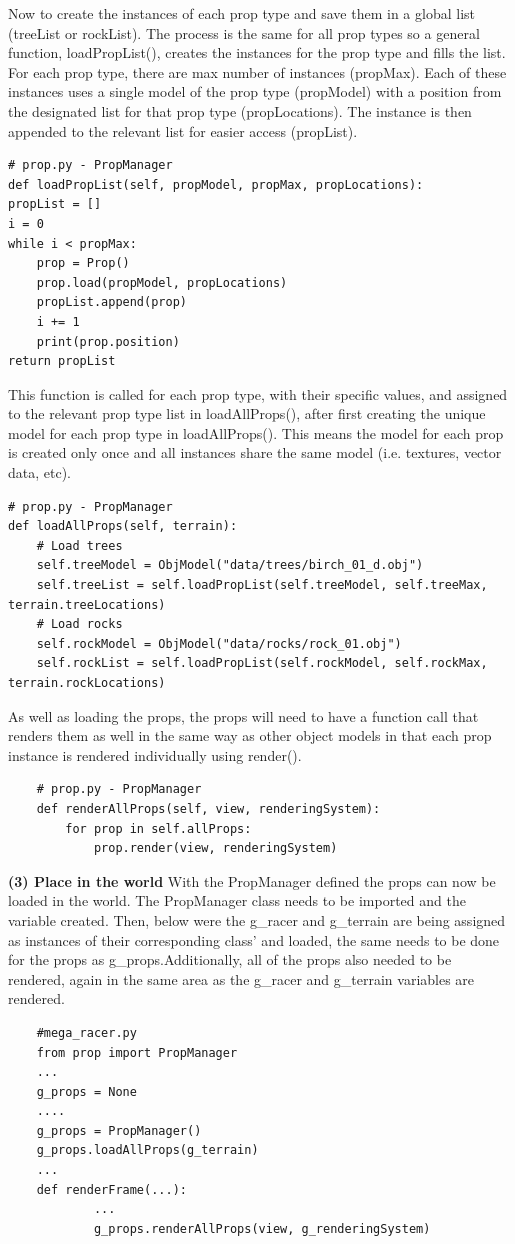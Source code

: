 \documentclass[a4 paper, 12pt]{article}
\begin{document}
Now to create the instances of each prop type and save them in a global list (treeList or rockList). The process is the same for all prop types so a general function, loadPropList(), creates the instances for the prop type and fills the list. For each prop type, there are max number of instances (propMax). Each of these instances uses a single model of the prop type (propModel) with a position from the designated list for that prop type (propLocations). The instance is then appended to the relevant list for easier access (propList). 
    \begin{lstlisting}
# prop.py - PropManager
def loadPropList(self, propModel, propMax, propLocations):
propList = []
i = 0
while i < propMax:
    prop = Prop()
    prop.load(propModel, propLocations)
    propList.append(prop)            
    i += 1
    print(prop.position)
return propList
    \end{lstlisting} 

This function is called for each prop type, with their specific values, and assigned to the relevant prop type list in loadAllProps(), after first creating the unique model for each prop type in loadAllProps(). This means the model for each prop is created only once and all instances share the same model (i.e. textures, vector data, etc). 
    \begin{lstlisting}
# prop.py - PropManager 
def loadAllProps(self, terrain): 
    # Load trees
    self.treeModel = ObjModel("data/trees/birch_01_d.obj")
    self.treeList = self.loadPropList(self.treeModel, self.treeMax, terrain.treeLocations)
    # Load rocks
    self.rockModel = ObjModel("data/rocks/rock_01.obj")
    self.rockList = self.loadPropList(self.rockModel, self.rockMax, terrain.rockLocations)
    \end{lstlisting}

As well as loading the props, the props will need to have a function call that renders them as well in the same way as other object models in that each prop instance is rendered individually using render().
\begin{lstlisting}
    # prop.py - PropManager 
    def renderAllProps(self, view, renderingSystem):
        for prop in self.allProps:
            prop.render(view, renderingSystem)
\end{lstlisting}

\textbf{(3) Place in the world}
With the PropManager defined the props can now be loaded in the world. The PropManager class needs to be imported and the variable created. Then, below were the g\_racer and g\_terrain are being assigned as instances of their corresponding class' and loaded, the same needs to be done for the props as g\_props.Additionally, all of the props also needed to be rendered, again in the same area as the g\_racer and g\_terrain variables are rendered.
    \begin{lstlisting}
    #mega_racer.py
    from prop import PropManager
    ...
    g_props = None
    ....
    g_props = PropManager()
    g_props.loadAllProps(g_terrain)
    ...
    def renderFrame(...):
            ...
            g_props.renderAllProps(view, g_renderingSystem)
    \end{lstlisting}
\end{document}
